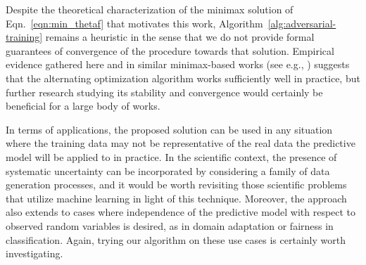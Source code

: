 \documentclass{article}
\theoremstyle{plain}
\begin{document}
Despite the theoretical characterization of the minimax solution of Eqn.~\ref{eqn:min_thetaf}
that motivates this work,
Algorithm~\ref{alg:adversarial-training} remains a heuristic in the sense
that we do not provide formal guarantees of convergence of the procedure towards
that solution. Empirical evidence gathered here and in similar minimax-based
 works (see e.g., \citep{goodfellow2014generative,EdwardsS15}) suggests
that the alternating optimization algorithm works sufficiently well in practice,
but further research studying its stability and convergence would certainly
be beneficial for a large body of works.

In terms of applications, the proposed solution can be used in any situation
where the training data may not be representative of the real data the
predictive model will be applied to in practice. In the scientific context, the
presence of systematic uncertainty can be incorporated by considering a family
of data generation processes, and it would be worth revisiting those scientific problems
that utilize machine learning in light of this technique. Moreover, the approach
also extends to cases where independence of the predictive model with respect to
observed random variables is desired, as in domain adaptation or fairness in
classification. Again, trying our algorithm on these use cases is certainly
worth investigating.



%





\end{document}
